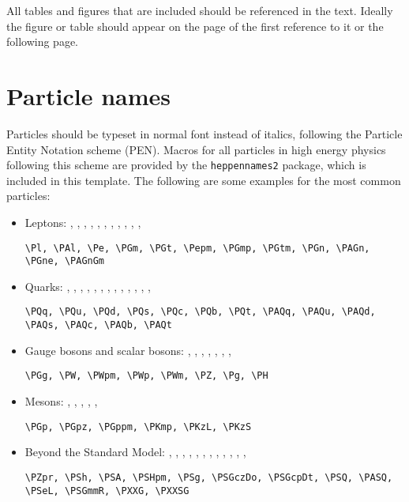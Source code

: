 All tables and figures that are included should be referenced in the text. Ideally the figure or table should appear on the page of the first reference to it or the following page.


\section{Particle names}
\label{sec:particles}

Particles should be typeset in normal font instead of italics, following the Particle Entity Notation scheme (PEN). Macros for all particles in high energy physics following this scheme are provided by the \texttt{heppennames2} package, which is included in this template. The following are some examples for the most common particles:
\begin{itemize}
  \item Leptons: \Pl, \PAl, \Pe, \PGm, \PGt, \Pepm, \PGmp, \PGtm, \PGn, \PAGn, \PGne, \PAGnGm
  \lstset{language=TeX}
  \begin{lstlisting}
\Pl, \PAl, \Pe, \PGm, \PGt, \Pepm, \PGmp, \PGtm, \PGn, \PAGn, \PGne, \PAGnGm
  \end{lstlisting}
  \item Quarks: \PQq, \PQu, \PQd, \PQs, \PQc, \PQb, \PQt, \PAQq, \PAQu, \PAQd, \PAQs, \PAQc, \PAQb, \PAQt
  \begin{lstlisting}
\PQq, \PQu, \PQd, \PQs, \PQc, \PQb, \PQt, \PAQq, \PAQu, \PAQd, \PAQs, \PAQc, \PAQb, \PAQt
  \end{lstlisting}
  \item Gauge bosons and scalar bosons: \PGg, \PW, \PWpm, \PWp, \PWm, \PZ, \Pg, \PH
  \begin{lstlisting}
\PGg, \PW, \PWpm, \PWp, \PWm, \PZ, \Pg, \PH
  \end{lstlisting}
  \item Mesons: \PGp, \PGpz, \PGppm, \PKmp, \PKzL, \PKzS
  \begin{lstlisting}
\PGp, \PGpz, \PGppm, \PKmp, \PKzL, \PKzS
  \end{lstlisting}
  \item Beyond the Standard Model: \PZpr, \PSh, \PSA, \PSHpm, \PSg, \PSGczDo, \PSGcpDt, \PSQ, \PASQ, \PSeL, \PSGmmR, \PXXG, \PXXSG
  \begin{lstlisting}
\PZpr, \PSh, \PSA, \PSHpm, \PSg, \PSGczDo, \PSGcpDt, \PSQ, \PASQ, \PSeL, \PSGmmR, \PXXG, \PXXSG
  \end{lstlisting} 
\end{itemize}


